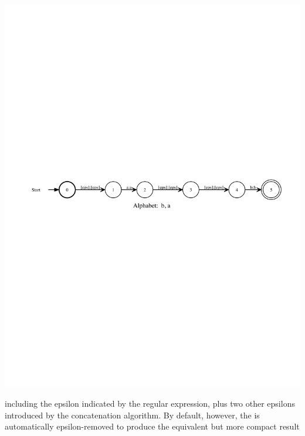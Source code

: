 \begin{center}
\includegraphics[width=135mm]{images/aEpsb.pdf}
\end{center}

\noindent
including the epsilon indicated by the regular expression, plus two other epsilons
introduced by the concatenation algorithm.  By default, however, the \fsm{}
is automatically epsilon-removed to produce the equivalent but more compact result

